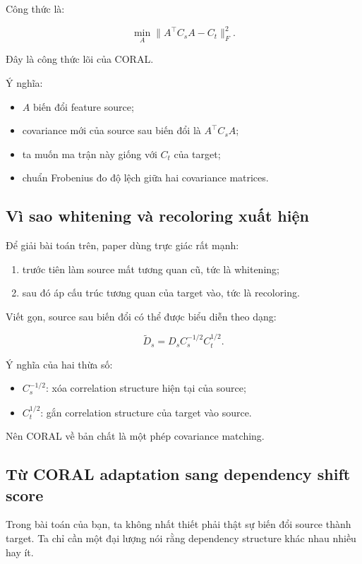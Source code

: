 \documentclass[a4paper]{article}
\begin{document}
Công thức là:

\[
\min_A \|A^\top C_s A - C_t\|_F^2.
\]

Đây là công thức lõi của CORAL.

Ý nghĩa:

\begin{itemize}
    \item $A$ biến đổi feature source;
    \item covariance mới của source sau biến đổi là $A^\top C_s A$;
    \item ta muốn ma trận này giống với $C_t$ của target;
    \item chuẩn Frobenius đo độ lệch giữa hai covariance matrices.
\end{itemize}

\subsection{Vì sao whitening và recoloring xuất hiện}

Để giải bài toán trên, paper dùng trực giác rất mạnh:

\begin{enumerate}[label=\arabic*.]
    \item trước tiên làm source mất tương quan cũ, tức là whitening;
    \item sau đó áp cấu trúc tương quan của target vào, tức là recoloring.
\end{enumerate}

Viết gọn, source sau biến đổi có thể được biểu diễn theo dạng:

\[
\widetilde D_s = D_s C_s^{-1/2} C_t^{1/2}.
\]

Ý nghĩa của hai thừa số:

\begin{itemize}
    \item $C_s^{-1/2}$: xóa correlation structure hiện tại của source;
    \item $C_t^{1/2}$: gắn correlation structure của target vào source.
\end{itemize}

Nên CORAL về bản chất là một phép covariance matching.

\subsection{Từ CORAL adaptation sang dependency shift score}

Trong bài toán của bạn, ta không nhất thiết phải thật sự biến đổi source thành target. Ta chỉ cần một đại lượng nói rằng dependency structure khác nhau nhiều hay ít.
\end{document}
